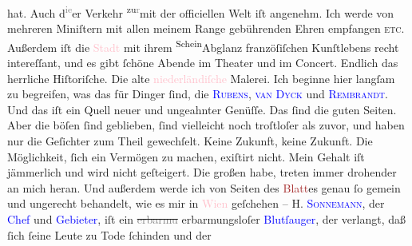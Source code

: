 \documentclass[twoside=false,titlepage=false,open=any, parskip=never, fontsize=12pt, headings=small, chapterprefix=false, appendixprefix=false]{scrbook}
\newcommand{\strikeout}[1]{\sout{#1}}
\newcommand{\Theight}{\dimexpr\fontcharht\font`W}
\newcommand{\pbposition}{\depth}
\newcommand{\pb}{\nobreak\hspace{0pt}\raisebox{-0.1em}{\raisebox{\pbposition}{\textnormal{|}}}\nobreak\hspace{0pt}}
\newcommand{\substVorne}{\textnormal{\raisebox{\Theight}{\raisebox{-\height}{\small\upp\normalsize}}}}
\newcommand{\substDazwischen}{}
\newcommand{\substHinten}{\textnormal{\raisebox{\Theight}{\raisebox{-\height}{\small\downp\normalsize}}}}
\begin{document}
               hat. Auch d\substVorne{}\textsuperscript{\textcolor{gray}{ie}}\substDazwischen{}er\substHinten{} Verkehr \substVorne{}\textsuperscript{zu\textcolor{gray}{r}}\substDazwischen{}mit der\substHinten{} officiellen Welt iſt angenehm. Ich werde von mehreren Miniſtern mit allen
               meinem Range gebührenden Ehren empfangen \textsc{etc.} Außerdem iſt
               die \textcolor{pink}{Stadt}{} mit ihrem \substVorne{}\textsuperscript{Schein}{\allowbreak}\substDazwischen{}Abglanz\substHinten{} franzöſiſchen Kunſtlebens recht intereſſant, und es gibt ſchöne Abende im
               Theater und im Concert. Endlich das herrliche Hiſtoriſche. Die alte \textcolor{pink}{niederländiſche}{}\ledrightnote{\textcolor{pink}{Niederlande}} Malerei. Ich beginne hier langſam zu
               begreifen, was das für Dinger ſind, die \textsc{\textcolor{blue}{Rubens}{}\ledrightnote{\textcolor{blue}{Peter Paul Rubens}}}, \textsc{\textcolor{blue}{van Dyck}{}\ledrightnote{\textcolor{blue}{Anthonis van Dyck}}} und \textsc{\textcolor{blue}{Rembrandt}{}\ledrightnote{\textcolor{blue}{Rembrandt van Rijn}}}. Und das iſt ein Quell neuer und {\pb}ungeahnter
               Genüſſe.\pend
           \pstart
           Das ſind die guten Seiten. Aber die böſen ſind geblieben, ſind vielleicht noch
               troſtloſer als zuvor, und haben nur die Geſichter zum Theil gewechſelt. Keine
               Zukunft, keine Zukunft. Die Möglichkeit, ſich ein Vermögen zu machen, exiſtirt nicht.
               Mein Gehalt iſt jämmerlich und wird nicht geſteigert. Die großen \label{K_L02669-999v}\label{K_L02669-999h} habe, treten immer drohender an mich heran. Und außerdem werde ich von Seiten
               des \textcolor{brown}{Blatt}{}es genau ſo gemein und
               ungerecht behandelt, wie es mir in \textcolor{pink}{Wien}{}\ledrightnote{\textcolor{pink}{Wien}} geſchehen
               – H. \textsc{\textcolor{blue}{Sonnemann}{}\ledrightnote{\textcolor{blue}{Leopold Sonnemann}}}, der \textcolor{blue}{Chef}{} und \textcolor{blue}{Gebieter}{}, iſt ein \strikeout{\textcolor{gray}{erbarmu}} erbarmungsloſer \textcolor{blue}{Blutſauger}{}, der verlangt, daß ſich ſeine Leute zu Tode ſchinden und der
\end{document}
